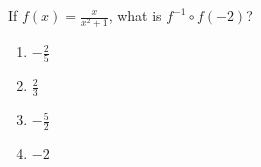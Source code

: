 \bigskip

\item If $\displaystyle f(x)=\frac{x}{x^2+1}$, what is $f^{-1}\circ f(-2)$?

    \begin{enumerate}
    \item $-\frac{2}{5}$
    \item $\frac{2}{3}$
    \item $-\frac{5}{2}$
    \item $-2$
    \end{enumerate}

